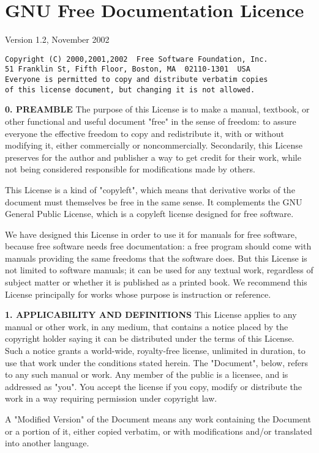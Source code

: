 \section{GNU Free Documentation Licence}
Version 1.2, November 2002

\begin{verbatim}
Copyright (C) 2000,2001,2002  Free Software Foundation, Inc.
51 Franklin St, Fifth Floor, Boston, MA  02110-1301  USA
Everyone is permitted to copy and distribute verbatim copies
of this license document, but changing it is not allowed.
\end{verbatim}

\textbf{0. PREAMBLE}
The purpose of this License is to make a manual, textbook, or other functional and useful document "free" in the sense of freedom: to assure everyone the effective freedom to copy and redistribute it, with or without modifying it, either commercially or noncommercially. Secondarily, this License preserves for the author and publisher a way to get credit for their work, while not being considered responsible for modifications made by others.

This License is a kind of "copyleft", which means that derivative works of the document must themselves be free in the same sense. It complements the GNU General Public License, which is a copyleft license designed for free software.

We have designed this License in order to use it for manuals for free software, because free software needs free documentation: a free program should come with manuals providing the same freedoms that the software does. But this License is not limited to software manuals; it can be used for any textual work, regardless of subject matter or whether it is published as a printed book. We recommend this License principally for works whose purpose is instruction or reference. 

\textbf{1. APPLICABILITY AND DEFINITIONS}
This License applies to any manual or other work, in any medium, that contains a notice placed by the copyright holder saying it can be distributed under the terms of this License. Such a notice grants a world-wide, royalty-free license, unlimited in duration, to use that work under the conditions stated herein. The "Document", below, refers to any such manual or work. Any member of the public is a licensee, and is addressed as "you". You accept the license if you copy, modify or distribute the work in a way requiring permission under copyright law.

A "Modified Version" of the Document means any work containing the Document or a portion of it, either copied verbatim, or with modifications and/or translated into another language.

